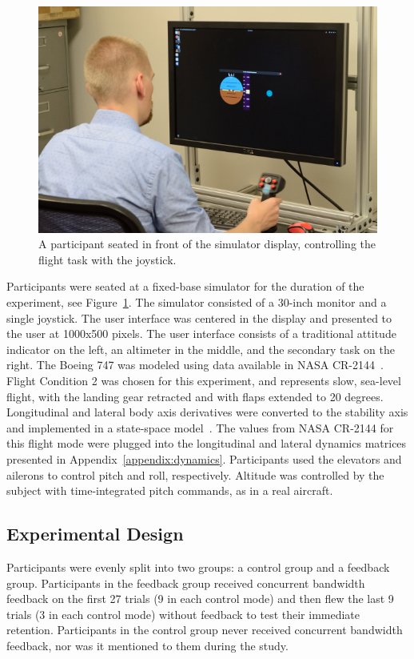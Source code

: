 \begin{figure}[b!]
    \begin{center}
        \includegraphics[width=0.8\linewidth]{figures/Aircraft/image2.png}
        \caption[A participant seated in front of the simulator display]{A participant seated in front of the simulator display, controlling the flight task with the joystick.}
        \label{figure-hfes:participant}
    \end{center}
\end{figure}

Participants were seated at a fixed-base simulator for the duration of the experiment, see Figure~\ref{figure-hfes:participant}.
The simulator consisted of a 30-inch monitor and a single joystick.
The user interface was centered in the display and presented to the user at 1000x500 pixels.
The user interface consists of a traditional attitude indicator on the left, an altimeter in the middle, and the secondary task on the right.
The Boeing 747 was modeled using data available in NASA CR-2144~\citep{heffley1972aircraft}.
Flight Condition 2 was chosen for this experiment, and represents slow, sea-level flight, with the landing gear retracted and with flaps extended to 20 degrees.
Longitudinal and lateral body axis derivatives were converted to the stability axis and implemented in a state-space model~\citep{stevens2015aircraft}.
The values from NASA CR-2144 for this flight mode were plugged into the longitudinal and lateral dynamics matrices presented in Appendix~\ref{appendix:dynamics}.
Participants used the elevators and ailerons to control pitch and roll, respectively.
Altitude was controlled by the subject with time-integrated pitch commands, as in a real aircraft.

\subsection{Experimental Design}
Participants were evenly split into two groups: a control group and a feedback group.
Participants in the feedback group received concurrent bandwidth feedback on the first 27 trials (9 in each control mode) and then flew the last 9 trials (3 in each control mode) without feedback to test their immediate retention.
Participants in the control group never received concurrent bandwidth feedback, nor was it mentioned to them during the study.

